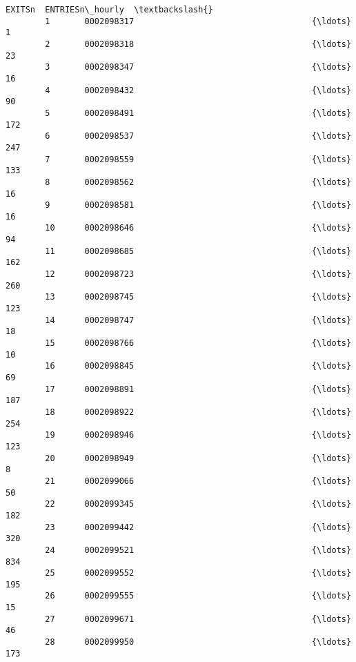 \documentclass[11pt]{article}
\begin{document}
\begin{Verbatim}[commandchars=\\\{\}]
                                                           EXITSn  ENTRIESn\_hourly  \textbackslash{}
        1       0002098317                                    {\ldots}                1   
        2       0002098318                                    {\ldots}               23   
        3       0002098347                                    {\ldots}               16   
        4       0002098432                                    {\ldots}               90   
        5       0002098491                                    {\ldots}              172   
        6       0002098537                                    {\ldots}              247   
        7       0002098559                                    {\ldots}              133   
        8       0002098562                                    {\ldots}               16   
        9       0002098581                                    {\ldots}               16   
        10      0002098646                                    {\ldots}               94   
        11      0002098685                                    {\ldots}              162   
        12      0002098723                                    {\ldots}              260   
        13      0002098745                                    {\ldots}              123   
        14      0002098747                                    {\ldots}               18   
        15      0002098766                                    {\ldots}               10   
        16      0002098845                                    {\ldots}               69   
        17      0002098891                                    {\ldots}              187   
        18      0002098922                                    {\ldots}              254   
        19      0002098946                                    {\ldots}              123   
        20      0002098949                                    {\ldots}                8   
        21      0002099066                                    {\ldots}               50   
        22      0002099345                                    {\ldots}              182   
        23      0002099442                                    {\ldots}              320   
        24      0002099521                                    {\ldots}              834   
        25      0002099552                                    {\ldots}              195   
        26      0002099555                                    {\ldots}               15   
        27      0002099671                                    {\ldots}               46   
        28      0002099950                                    {\ldots}              173   

\end{Verbatim}
\end{document}

